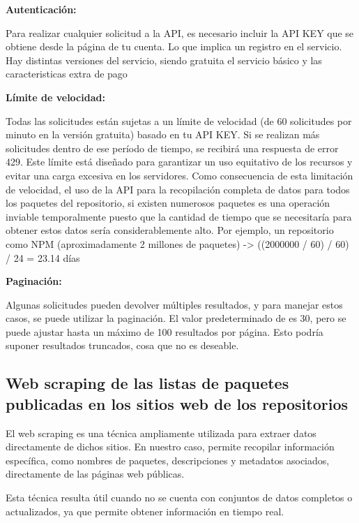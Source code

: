 \textbf{Autenticación:}

Para realizar cualquier solicitud a la API, es necesario incluir la API KEY que se obtiene desde la página de tu cuenta. Lo que implica un registro en el servicio.
Hay distintas versiones del servicio, siendo gratuita el servicio básico y las caracteristicas extra de pago

\textbf{Límite de velocidad:}

Todas las solicitudes están sujetas a un límite de velocidad (de 60 solicitudes por minuto en la versión gratuita) basado en tu API KEY. Si se realizan más solicitudes dentro de ese período de tiempo, se recibirá una respuesta de error 429. Este límite está diseñado para garantizar un uso equitativo de los recursos y evitar una carga excesiva en los servidores.
Como consecuencia de esta limitación de velocidad, el uso de la API para la recopilación completa de datos para todos los paquetes del repositorio, si existen numerosos paquetes es una operación inviable temporalmente puesto que la cantidad de tiempo que se necesitaría para obtener estos datos sería considerablemente alto. Por ejemplo, un repositorio como NPM (aproximadamente 2 millones de paquetes) -> ((2000000 / 60) / 60) / 24 = 23.14 días

\textbf{Paginación:}

Algunas solicitudes pueden devolver múltiples resultados, y para manejar estos casos, se puede utilizar la paginación. El valor predeterminado de es 30, pero se puede ajustar hasta un máximo de 100 resultados por página. Esto podría suponer resultados truncados, cosa que no es deseable.

\subsection{Web scraping de las listas de paquetes publicadas en los sitios web de los repositorios}

El web scraping es una técnica ampliamente utilizada para extraer datos directamente de dichos sitios. En nuestro caso, permite recopilar información específica, como nombres de paquetes, descripciones y metadatos asociados, directamente de las páginas web públicas. 

Esta técnica resulta útil cuando no se cuenta con conjuntos de datos completos o actualizados, ya que permite obtener información en tiempo real.

